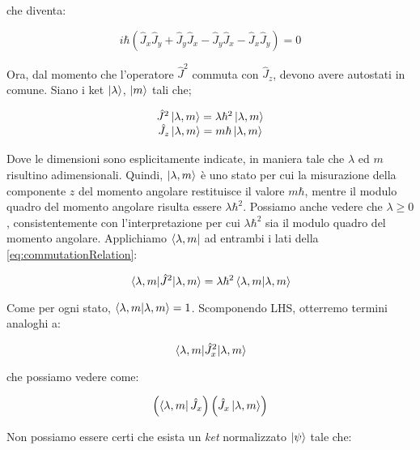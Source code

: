 che diventa:

	\begin{equation}
		i \hbar \left ( \hat{J}_x \hat{J}_y + \hat{J}_y \hat{J}_x - \hat{J}_y \hat{J}_x - \hat{J}_x \hat{J}_y \right ) = 0
	\end{equation}

Ora, dal momento che l'operatore $\hat{J}^2$ commuta con $\hat{J}_z$, devono avere autostati in comune. Siano i ket $\ket{\lambda}$, $\ket{m}$ tali che;

	\begin{equation} \label{eq:commutationRelation}
		\begin{array} {c}
			\hat{J}^2 \ket{\lambda, m} = \lambda \hbar^2 \ket{\lambda, m} \\
			\hat{J}_z \ket{\lambda, m} = m \hbar \ket{\lambda, m}
		\end{array}
	\end{equation}

Dove le dimensioni sono esplicitamente indicate, in maniera tale che $\lambda$ ed $m$ risultino adimensionali. Quindi, $\ket{\lambda, m}$ \`e uno stato per cui la misurazione della componente $z$ del momento angolare restituisce il valore $m \hbar$, mentre il modulo quadro del momento angolare risulta essere $\lambda \hbar^2$. Possiamo anche vedere che $\lambda \ge 0$, consistentemente con l'interpretazione per cui $\lambda \hbar^2$ sia il modulo quadro del momento angolare. Applichiamo $\bra{\lambda, m}$ ad entrambi i lati della \eqref{eq:commutationRelation}:

	\begin{equation}
		\mel{\lambda, m}{\hat{J}^2}{\lambda, m} = \lambda \hbar^2 \braket{\lambda, m}{\lambda, m}
	\end{equation}

Come per ogni stato, $\braket{\lambda, m}{\lambda, m} = 1$. Scomponendo LHS, otterremo termini analoghi a:

	\begin{equation} 
		\mel{\lambda, m}{\hat{J}_x^2}{\lambda, m}
	\end{equation}

che possiamo vedere come:

	\begin{equation} \label{eq:genericMatrixElement}
		\left ( \bra{\lambda, m} \hat{J}_x \right ) \left ( \hat{J}_x \ket{\lambda, m} \right )
	\end{equation}

Non possiamo essere certi che esista un \textit{ket} normalizzato $\ket{\psi}$ tale che:

